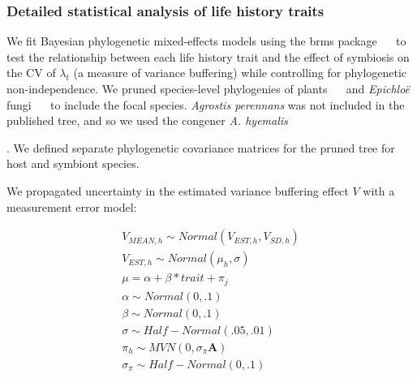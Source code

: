 \documentclass[lineno,sn-nature]{sn-jnl}%
\providecommand{\DIFadd}[1]{{\protect\color{blue}#1}} %
\providecommand{\DIFadd}[1]{{\protect\color{blue}\uwave{#1}}} %
\begin{document}
\begin{appendices}
\subsubsection*{\DIFadd{Detailed statistical analysis of life history traits}}
\DIFadd{We fit Bayesian phylogenetic mixed-effects models using the brms package \mbox{%
\cite{Burkner2017brms} }\hspace{0pt}%
to test the relationship between each life history trait and the effect of symbiosis on the CV of $\lambda_{t}$ (a measure of variance buffering) while controlling for phylogenetic non-independence.
We pruned species-level phylogenies of plants \mbox{%
\cite{zanne2014three} }\hspace{0pt}%
and }\emph{\DIFadd{Epichlo\"{e}}} \DIFadd{fungi \mbox{%
\cite{leuchtmann2014nomenclatural} }\hspace{0pt}%
to include the focal species.
}\emph{\DIFadd{Agrostis perennans}} \DIFadd{was not included in the published tree, and so we used the congener }\emph{\DIFadd{A. hyemalis}}\DIFadd{. 
We defined separate phylogenetic covariance matrices for the pruned tree for host and symbiont species.

}

\DIFadd{We propagated uncertainty in the estimated variance buffering effect $V$ with a measurement error model:

}

\begin{subequations}
	\begin{align}
		V_{MEAN,h} \sim Normal(V_{EST,h}, V_{SD,h})\\
		V_{EST,h} \sim Normal(\mu_h,\sigma)\\
		\mu = \alpha + \beta*trait + \pi _j\\
		\alpha \sim Normal(0,.1)\\
		\beta \sim Normal(0,.1)\\
		\sigma \sim Half-Normal(.05,.01)\\
		\pi_h \sim MVN(0,\sigma_{\pi}\mathbf{A})\\
		\sigma_{\pi} \sim Half-Normal(0,.1)
	\end{align}
\end{subequations}


\end{appendices}
\end{document}
